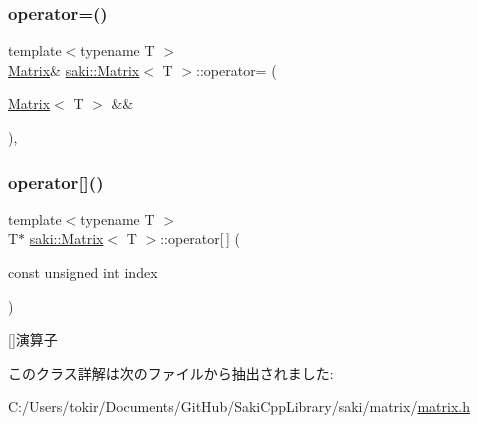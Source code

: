 \subsubsection{\texorpdfstring{operator=()}{operator=()}\hspace{0.1cm}{\footnotesize\ttfamily [2/2]}}
{\footnotesize\ttfamily template$<$typename T $>$ \\
\mbox{\hyperlink{classsaki_1_1_matrix}{Matrix}}\& \mbox{\hyperlink{classsaki_1_1_matrix}{saki\+::\+Matrix}}$<$ T $>$\+::operator= (\begin{DoxyParamCaption}\item[{\mbox{\hyperlink{classsaki_1_1_matrix}{Matrix}}$<$ T $>$ \&\&}]{ }\end{DoxyParamCaption})\hspace{0.3cm}{\ttfamily [default]}, {\ttfamily [noexcept]}}

\mbox{\label{classsaki_1_1_matrix_ad1fa9ab13d6ab9def73a4ac5bfa15cf4}} 
\subsubsection{\texorpdfstring{operator[]()}{operator[]()}}
{\footnotesize\ttfamily template$<$typename T $>$ \\
T$\ast$ \mbox{\hyperlink{classsaki_1_1_matrix}{saki\+::\+Matrix}}$<$ T $>$\+::operator\mbox{[}$\,$\mbox{]} (\begin{DoxyParamCaption}\item[{const unsigned int}]{index }\end{DoxyParamCaption})\hspace{0.3cm}{\ttfamily [inline]}}



\mbox{[}\mbox{]}演算子 



このクラス詳解は次のファイルから抽出されました\+:\begin{DoxyCompactItemize}
\item 
C\+:/\+Users/tokir/\+Documents/\+Git\+Hub/\+Saki\+Cpp\+Library/saki/matrix/\mbox{\hyperlink{matrix_8h}{matrix.\+h}}\end{DoxyCompactItemize}
